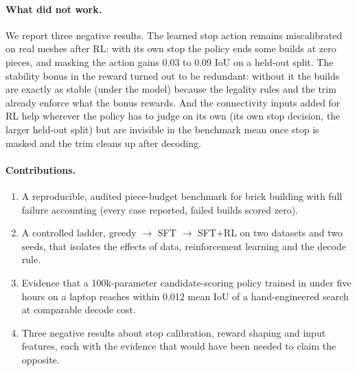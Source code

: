 \paragraph{What did not work.} We report three negative results. The learned stop action remains miscalibrated on
real meshes after RL: with its own stop the policy ends some builds at zero pieces, and masking the action gains 0.03
to 0.09 IoU on a held-out split. The stability bonus in the reward turned out to be redundant: without it the builds
are exactly as stable (under the model) because the legality rules and the trim already enforce what the bonus
rewards. And the connectivity inputs added for RL help wherever the policy has to judge on its own (its own stop
decision, the larger held-out split) but are invisible in the benchmark mean once stop is masked and the trim cleans
up after decoding.

\paragraph{Contributions.}
\begin{enumerate}
  \item A reproducible, audited piece-budget benchmark for brick building with full failure accounting (every case
  reported, failed builds scored zero).
  \item A controlled ladder, greedy $\rightarrow$ SFT $\rightarrow$ SFT+RL on two datasets and two seeds, that
  isolates the effects of data, reinforcement learning and the decode rule.
  \item Evidence that a 100k-parameter candidate-scoring policy trained in under five hours on a laptop reaches within
  0.012 mean IoU of a hand-engineered search at comparable decode cost.
  \item Three negative results about stop calibration, reward shaping and input features, each with the evidence that
  would have been needed to claim the opposite.
\end{enumerate}
